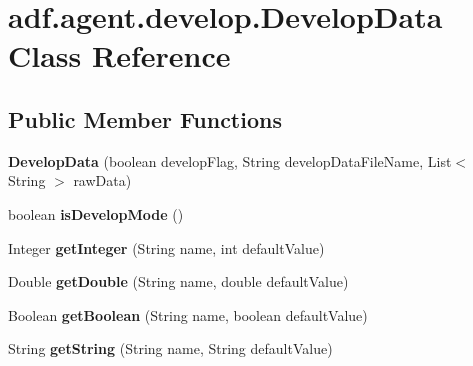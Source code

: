 \hypertarget{classadf_1_1agent_1_1develop_1_1DevelopData}{}\section{adf.\+agent.\+develop.\+Develop\+Data Class Reference}
\label{classadf_1_1agent_1_1develop_1_1DevelopData}
\subsection*{Public Member Functions}
\begin{DoxyCompactItemize}
\item 
\hypertarget{classadf_1_1agent_1_1develop_1_1DevelopData_aef4cf489592feb7ff0a5947dbf7329cc}{}\label{classadf_1_1agent_1_1develop_1_1DevelopData_aef4cf489592feb7ff0a5947dbf7329cc} 
{\bfseries Develop\+Data} (boolean develop\+Flag, String develop\+Data\+File\+Name, List$<$ String $>$ raw\+Data)
\item 
\hypertarget{classadf_1_1agent_1_1develop_1_1DevelopData_aa504c579f983433f4b83b911e5808f2b}{}\label{classadf_1_1agent_1_1develop_1_1DevelopData_aa504c579f983433f4b83b911e5808f2b} 
boolean {\bfseries is\+Develop\+Mode} ()
\item 
\hypertarget{classadf_1_1agent_1_1develop_1_1DevelopData_af55569be14e228d98738d15d0214d0ad}{}\label{classadf_1_1agent_1_1develop_1_1DevelopData_af55569be14e228d98738d15d0214d0ad} 
Integer {\bfseries get\+Integer} (String name, int default\+Value)
\item 
\hypertarget{classadf_1_1agent_1_1develop_1_1DevelopData_a185a4a55199c5199943e6e18bc173d07}{}\label{classadf_1_1agent_1_1develop_1_1DevelopData_a185a4a55199c5199943e6e18bc173d07} 
Double {\bfseries get\+Double} (String name, double default\+Value)
\item 
\hypertarget{classadf_1_1agent_1_1develop_1_1DevelopData_a543879df41f6ac2c40406271d6f724ab}{}\label{classadf_1_1agent_1_1develop_1_1DevelopData_a543879df41f6ac2c40406271d6f724ab} 
Boolean {\bfseries get\+Boolean} (String name, boolean default\+Value)
\item 
\hypertarget{classadf_1_1agent_1_1develop_1_1DevelopData_a7cedf349b54c1337d6ae36eea73f3753}{}\label{classadf_1_1agent_1_1develop_1_1DevelopData_a7cedf349b54c1337d6ae36eea73f3753} 
String {\bfseries get\+String} (String name, String default\+Value)
\item 
\hypertarget{classadf_1_1agent_1_1develop_1_1DevelopData_a8b53099cdeed50c7a27c741851e1e459}{}\label{classadf_1_1agent_1_1develop_1_1DevelopData_a8b53099cdeed50c7a27c741851e1e459} 

\end{DoxyCompactItemize}
